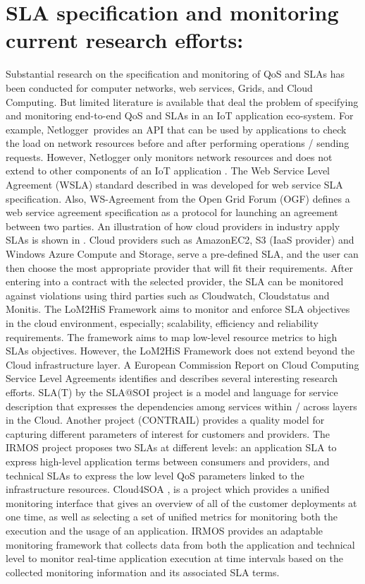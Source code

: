 \section{SLA specification and monitoring current research efforts:}

Substantial research on the specification and monitoring of QoS and SLAs has been conducted for computer networks, web services, Grids, and Cloud Computing.
But limited literature is available that deal the problem of specifying and monitoring end-to-end QoS and SLAs in an IoT application eco-system.
For example, Netlogger provides an API that can be used by applications to check the load on network resources before and after performing operations / sending requests.
However, Netlogger only monitors network resources and does not extend to other components of an IoT application \cite{ref14,ref15}.
The Web Service Level Agreement (WSLA) standard described in \cite{ref16} was developed for web service SLA specification.
Also, WS-Agreement from the Open Grid Forum (OGF) defines a web service agreement specification as a protocol for launching an agreement between two parties.
An illustration of how cloud providers in industry apply SLAs is shown in \cite{ref21}.
Cloud providers such as AmazonEC2, S3 (IaaS provider) and Windows Azure Compute and Storage, serve a pre-defined SLA, and the user can then choose the most appropriate provider that will fit their requirements.
After entering into a contract with the selected provider, the SLA can be monitored against violations using third parties such as Cloudwatch, Cloudstatus and Monitis.
The LoM2HiS Framework \cite{ref14} aims to monitor and enforce SLA objectives in the cloud environment, especially; scalability, efficiency and reliability requirements.
The framework aims to map low-level resource metrics to high SLAs objectives.
However, the LoM2HiS Framework does not extend beyond the Cloud infrastructure layer.
A European Commission Report on Cloud Computing Service Level Agreements \cite{ref24} identifies and describes several interesting research efforts.
SLA(T) by the SLA@SOI project \cite{ref25,ref27} is a model and language for service description that expresses the dependencies among services within / across layers in the Cloud. Another project (CONTRAIL) provides a quality model \cite{ref28} for capturing different parameters of interest for customers and providers.
The IRMOS project \cite{ref3} proposes two SLAs at different levels: an application SLA to express high-level application terms between consumers and providers, and technical SLAs to express the low level QoS parameters linked to the infrastructure resources.
Cloud4SOA \cite{ref31}, is a project which provides a unified monitoring interface that gives an overview of all of the customer deployments at one time, as well as selecting a set of unified metrics for monitoring both the execution and the usage of an application.
IRMOS \cite{ref32} provides an adaptable monitoring framework that collects data from both the application and technical level to monitor real-time application execution at time intervals based on the collected monitoring information and its associated SLA terms. 

